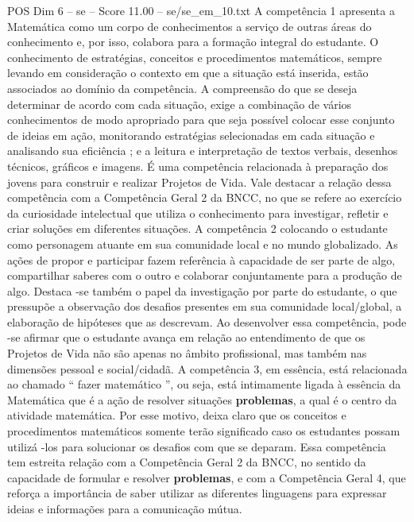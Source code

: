 \begin{textsample}{POS Dim 6 – se – Score 11.00 – se/se\_em\_10.txt}  \label{ex:f6_pos_041}
A competência 1 apresenta a Matemática como um corpo de conhecimentos a serviço de outras áreas do conhecimento e, por isso, colabora para a formação integral do estudante.
O conhecimento de estratégias, conceitos e procedimentos matemáticos, sempre levando em consideração o contexto em que a situação está inserida, estão associados ao domínio da competência.
A compreensão do que se deseja determinar de acordo com cada situação, exige a combinação de vários conhecimentos de modo apropriado para que seja possível colocar esse conjunto de ideias em ação, monitorando estratégias selecionadas em cada situação e analisando sua eficiência ; e a leitura e interpretação de textos verbais, desenhos técnicos, gráficos e imagens.
É uma competência relacionada à preparação dos jovens para construir e realizar Projetos de Vida.
Vale destacar a relação dessa competência com a Competência Geral 2 da BNCC, no que se refere ao exercício da curiosidade intelectual que utiliza o conhecimento para investigar, refletir e criar soluções em diferentes situações.
A competência 2 colocando o estudante como personagem atuante em sua comunidade local e no mundo globalizado.
As ações de propor e participar fazem referência à capacidade de ser parte de algo, compartilhar saberes com o outro e colaborar conjuntamente para a produção de algo.
Destaca -se também o papel da investigação por parte do estudante, o que pressupõe a observação dos desafios presentes em sua comunidade local/global, a elaboração de hipóteses que as descrevam.
Ao desenvolver essa competência, pode -se afirmar que o estudante avança em relação ao entendimento de que os Projetos de Vida não são apenas no âmbito profissional, mas também nas dimensões pessoal e social/cidadã.
A competência 3, em essência, está relacionada ao chamado “ fazer matemático ”, ou seja, está intimamente ligada à essência da Matemática que é a ação de resolver situações \textbf{problemas}, a qual é o centro da atividade matemática.
Por esse motivo, deixa claro que os conceitos e procedimentos matemáticos somente terão significado caso os estudantes possam utilizá -los para solucionar os desafios com que se deparam.
Essa competência tem estreita relação com a Competência Geral 2 da BNCC, no sentido da capacidade de formular e resolver \textbf{problemas}, e com a Competência Geral 4, que reforça a importância de saber utilizar as diferentes linguagens para expressar ideias e informações para a comunicação mútua.

\end{textsample}
